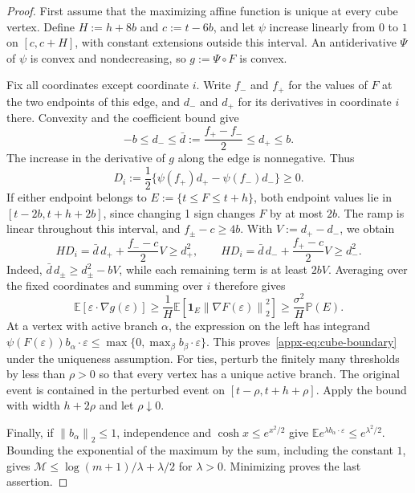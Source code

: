 \documentclass[11pt,letterpaper]{article}
\theoremstyle{remark}
\newcommand{\E}{\mathbb E}
\newcommand{\Pp}{\mathbb P}
\newcommand{\norm}[1]{\left\lVert#1\right\rVert}
\newcommand{\ind}{\mathbf 1}
\begin{document}
\begin{proof}
First assume that the maximizing affine function is unique at every
cube vertex. {Define} \(H:=h+8b\) and \(c:=t-6b\), and let \(\psi\)
increase linearly from \(0\) to \(1\) on \([c,c+H]\), with constant
extensions outside this interval. An antiderivative \(\Psi\) of
\(\psi\) is convex and nondecreasing, so \(g:=\Psi\circ F\) is convex.

Fix all coordinates except coordinate \(i\). Write \(f_-\) and
\(f_+\) for the values of \(F\) at the two endpoints of this edge,
and \(d_-\) and \(d_+\) for its derivatives in coordinate \(i\)
there. Convexity and the coefficient bound give
\[
 -b\le d_-\le\bar d:=\frac{f_+-f_-}{2}\le d_+\le b.
\]
The increase in the derivative of \(g\) along the edge is nonnegative.
Thus
\[
 D_i:=\frac12\{\psi(f_+)d_+-\psi(f_-)d_-\}\ge0.
\]
If either endpoint belongs to \(E:=\{t\le F\le t+h\}\), both
endpoint values lie in \([t-2b,t+h+2b]\), since changing 1 sign
changes \(F\) by at most \(2b\). The ramp is linear throughout
this interval, and \(f_\pm-c\ge4b\). With \(V:=d_+-d_-\), we obtain
\[
 HD_i=\bar d\,d_++\frac{f_--c}{2}V\ge d_+^2,
 \qquad
 HD_i=\bar d\,d_-+\frac{f_+-c}{2}V\ge d_-^2.
\]
Indeed, \(\bar d\,d_\pm\ge d_\pm^2-bV\), while each remaining
term is at least \(2bV\). Averaging over the fixed coordinates
and summing over \(i\) therefore gives
\[
 \E[\varepsilon\cdot\nabla g(\varepsilon)]
 \ge\frac1H\E[\ind_E\norm{\nabla F(\varepsilon)}_2^2]
 \ge\frac{\sigma^2}{H}\Pp(E).
\]
At a vertex with active branch \(\alpha\), the expression on the
left has integrand
\(\psi(F(\varepsilon))b_\alpha\cdot\varepsilon
 \le\max\{0,\max_\beta b_\beta\cdot\varepsilon\}\).
This proves~\eqref{appx-eq:cube-boundary} under the uniqueness assumption.
For ties, perturb the finitely many thresholds by less than \(\rho>0\)
so that every vertex has a unique active branch. The original event
is contained in the perturbed event on \([t-\rho,t+h+\rho]\).
Apply the bound with width \(h+2\rho\) and let \(\rho\downarrow0\).

Finally, if \(\norm{b_\alpha}_2\le1\), independence and
\(\cosh x\le e^{x^2/2}\) give
\(\E e^{\lambda b_\alpha\cdot\varepsilon}\le e^{\lambda^2/2}\).
Bounding the exponential of the maximum by the sum, including
the constant \(1\), gives
\(\mathcal M\le\log(m+1)/\lambda+\lambda/2\) for \(\lambda>0\).
Minimizing proves the last assertion.
\end{proof}
\end{document}
